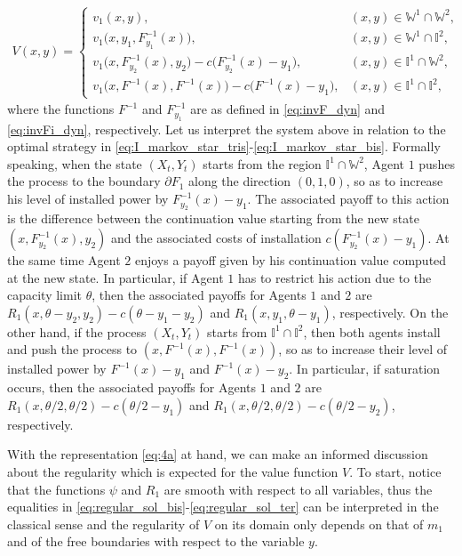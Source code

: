 \documentclass[10pt]{article}
\numberwithin{equation}{section}
\theoremstyle{plain}
\numberwithin{theorem}{section}
\theoremstyle{definition}
\def \p {\partial}
\newcommand{\<}{\langle}
\renewcommand{\>}{\rangle}
\renewcommand{\(}{\left(}
\renewcommand{\)}{\right)}
\def \p {{\partial}}
\begin{document}
{{{\begin{align}
V(x,y)=\begin{cases}
v_1(x,y), & (x,y)\in \mathbb{W}^1\cap \mathbb{W}^2, \\
v_1\big(x,y_1,F^{-1}_{y_1}(x)\big), & (x,y)\in \mathbb{W}^1\cap \mathbb{I}^2 ,\\
v_1\big(x, F^{-1}_{y_2}(x),y_2\big)-c\big(F^{-1}_{y_2}(x)-y_1\big), & (x,y)\in \mathbb{I}^1\cap \mathbb{W}^2 , \\
v_1\big(x, F^{-1}(x),F^{-1}(x)\big)-c\big( F^{-1}(x)-y_1\big), & (x,y)\in \mathbb{I}^1\cap \mathbb{I}^2,
\end{cases}\label{eq:value}
\end{align}
where the functions $F^{-1}$ and $F^{-1}_{y_1}$ are as defined in \eqref{eq:invF_dyn} and \eqref{eq:invFi_dyn}, respectively.
Let us interpret the system above in relation to the optimal strategy in \eqref{eq:I_markov_star_tris}-\eqref{eq:I_markov_star_bis}.
Formally speaking, when the state $(X_t,Y_t)$ starts from the region $\mathbb{I}^1\cap \mathbb{W}^2$, Agent $1$ pushes the process to the boundary $\p F_1$ along the direction $(0,1,0)$, so as to increase his level of installed power by $F^{-1}_{y_2}(x)-y_1$. 
The associated payoff to this action is the difference between the continuation value starting from the new state 
$(x,F^{-1}_{y_2}(x),y_2)$ and the associated costs of installation $c\left( F^{-1}_{y_2}(x)-y_1\right)$. At the same time Agent $2$ enjoys a payoff given by his continuation value computed at the new state. 
In particular, if Agent $1$ has to restrict his action due to the capacity limit $\theta$, then the associated payoffs for Agents $1$ and $2$ are $R_1(x,\theta-y_2,y_2)-c(\theta-y_1-y_2)$ and $R_1(x,y_1,\theta-y_1)$, respectively. 
On the other hand, if the process $(X_t,Y_t)$ starts from $\mathbb{I}^1\cap \mathbb{I}^2$, then both agents install and push the process to $(x,F^{-1}(x), F^{-1}(x))$, so as to increase their level of installed power by $F^{-1}(x)-y_1$ and  $F^{-1}(x)-y_2$. In particular, if saturation occurs, then the associated payoffs for Agents $1$ and $2$ are $R_1(x,\theta/2,\theta/2)-c(\theta/2 - y_1)$ and $R_1(x,\theta/2,\theta/2)-c(\theta/2 - y_2)$, respectively. 

\medskip
With the representation \eqref{eq:4a} at hand, %
we can make an informed discussion about the regularity which is expected for the value function $V$. To start, notice that the functions $\psi$ and $R_1$ are smooth with respect to all variables, thus the equalities in \eqref{eq:regular_sol_bis}-\eqref{eq:regular_sol_ter} can be interpreted in the classical sense and the regularity of $V$ on its domain only depends on that of $m_1$ and of the free boundaries with respect to the variable $y$. 

}}}
\end{document}
